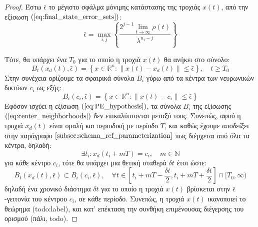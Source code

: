 \begin{proof}
	
Έστω $\bar{\epsilon}$ το μέγιστο σφάλμα μόνιμης κατάστασης της τροχιάς $x(t)$, από την εξίσωση $(\ref{eq:final_state_error_sets})$:
\begin{equation}
	\bar{\epsilon} = \max_{i,j} \left\{ \frac{ 2^{j-1} \lim\limits_{t \rightarrow \infty}\rho(t)}{\lambda^{n_i - j}} \right\}
\end{equation}

Τότε, θα υπάρχει ένα $T_0$ για το οποίο η τροχιά $x(t)$ θα ανήκει στο σύνολο:
\begin{equation}
	B_t(x_d(t),\bar{\epsilon} ) = 
	\left\{ x \in\mathbb{R}^n : \| x(t) - x_d(t) \| \leq \bar{\epsilon} \right\},
	\quad t \geq T_0
\end{equation}
Στην συνέχεια ορίζουμε τα σφαιρικά σύνολα $B_i$ γύρω από τα κέντρα των νευρωνικών δικτύων $c_i$ ως εξής:
\begin{equation}
B_i(c_i,\bar{\epsilon} ) = 
\left\{ x \in\mathbb{R}^n : \| x(t) - c_i \| \leq \bar{\epsilon} \right\}
\label{eq:center_neighborhoods}
\end{equation}
Εφόσον ισχύει η εξίσωση $(\ref{eq:PE_hypothesis})$, τα σύνολα $B_i$ της εξίσωσης $(\ref{eq:center_neighborhoods})$ δεν επικαλύπτονται μεταξύ τους. Συνεπώς, αφού η τροχιά $x_d(t)$ είναι ομαλή και περιοδική με περίοδο $T$, και καθώς έχουμε αποδείξει στην παράγραφο $\ref{subsec:schema_ref_parameterization}$ πως διέρχεται από όλα τα κέντρα, δηλαδή:
\begin{equation*}
	\exists t_i : x_d(t_i + mT) = c_i, \quad m \in \mathbb{N} 
\end{equation*}
για κάθε κέντρο $c_i$, τότε θα υπάρχει μια θετική σταθερά $\delta t$ έτσι ώστε:
\begin{equation*}
	B_t(x_d(t),\bar{\epsilon} ) \subset B_i(c_i,\bar{\epsilon} ), 
	\quad \forall t \in \left[t_i + mT - \frac{\delta t}{2}, t_i + mT + \frac{\delta t}{2} \right] \cap [T_0, \infty)
\end{equation*}
δηλαδή ένα χρονικό διάστημα $\delta t$ για το οποίο η τροχιά $x(t)$ βρίσκεται στην $\bar{\epsilon}$-γειτονία του κέντρου $c_i$, σε κάθε περίοδο. Συνεπώς, η τροχιά $x(t)$ ικανοποιεί το θεώρημα (todo:label), και κατ' επέκταση την συνθήκη επιμένουσας διέγερσης του ορισμού (πάλι, todo).


\end{proof}
